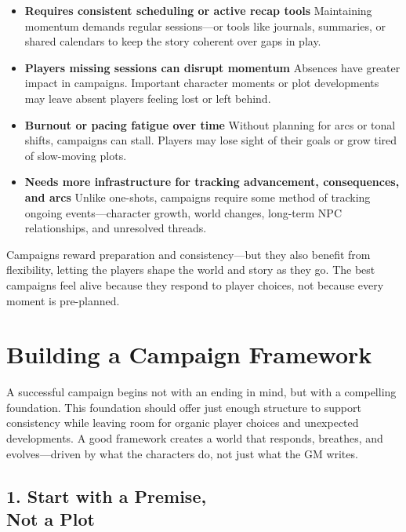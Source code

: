 \begin{itemize}
    \item \textbf{Requires consistent scheduling or active recap tools}  
    Maintaining momentum demands regular sessions—or tools like journals, summaries, or shared calendars to keep the story coherent over gaps in play.

    \item \textbf{Players missing sessions can disrupt momentum}  
    Absences have greater impact in campaigns. Important character moments or plot developments may leave absent players feeling lost or left behind.

    \item \textbf{Burnout or pacing fatigue over time}  
    Without planning for arcs or tonal shifts, campaigns can stall. Players may lose sight of their goals or grow tired of slow-moving plots.

    \item \textbf{Needs more infrastructure for tracking advancement, consequences, and arcs}  
    Unlike one-shots, campaigns require some method of tracking ongoing events—character growth, world changes, long-term NPC relationships, and unresolved threads.
\end{itemize}

Campaigns reward preparation and consistency—but they also benefit from flexibility, letting the players shape the world and story as they go. The best campaigns feel alive because they respond to player choices, not because every moment is pre-planned.





\section{Building a Campaign Framework}

A successful campaign begins not with an ending in mind, but with a compelling foundation. This foundation should offer just enough structure to support consistency while leaving room for organic player choices and unexpected developments. A good framework creates a world that responds, breathes, and evolves—driven by what the characters do, not just what the GM writes.

\subsection*{1. Start with a Premise,\\ Not a Plot}

